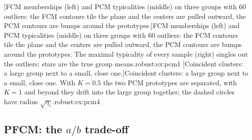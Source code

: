 [FCM memberships (left) and PCM typicalities (middle) on three groups with 60 outliers: the FCM contours tile the plane and the centers are pulled outward, the PCM contours are bumps around the prototypes.]{FCM memberships (left) and PCM typicalities (middle) on three groups with 60 outliers: the FCM contours tile the plane and the centers are pulled outward, the PCM contours are bumps around the prototypes. The maximal typicality of every sample (right) singles out the outliers; stars are the true group means.}{robust:ex:pcm1}
[Coincident clusters: a large group next to a small, close one.]{Coincident clusters: a large group next to a small, close one. With $K=0.5$ the two PCM prototypes are separated, with $K=1$ and beyond they drift into the large group together; the dashed circles have radius $\sqrt{\eta_i}$.}{robust:ex:pcm4}

\subsection{PFCM: the \texorpdfstring{$a/b$}{a/b} trade-off}\label{sec:robust:ex:pfcm}


